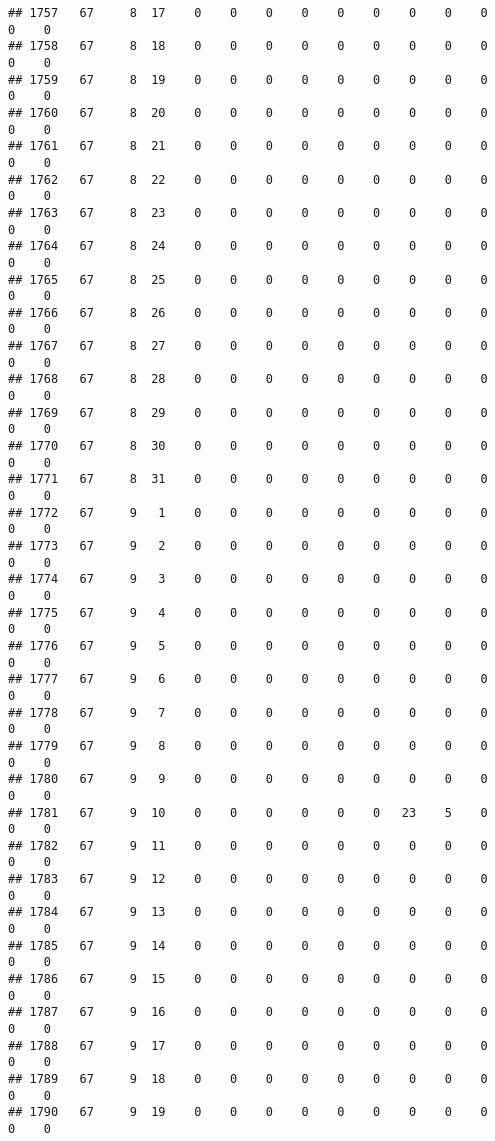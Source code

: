 \documentclass[]{article}
\begin{document}
\begin{verbatim}
## 1757   67     8  17    0    0    0    0    0    0    0    0    0    0    0
## 1758   67     8  18    0    0    0    0    0    0    0    0    0    0    0
## 1759   67     8  19    0    0    0    0    0    0    0    0    0    0    0
## 1760   67     8  20    0    0    0    0    0    0    0    0    0    0    0
## 1761   67     8  21    0    0    0    0    0    0    0    0    0    0    0
## 1762   67     8  22    0    0    0    0    0    0    0    0    0    0    0
## 1763   67     8  23    0    0    0    0    0    0    0    0    0    0    0
## 1764   67     8  24    0    0    0    0    0    0    0    0    0    0    0
## 1765   67     8  25    0    0    0    0    0    0    0    0    0    0    0
## 1766   67     8  26    0    0    0    0    0    0    0    0    0    0    0
## 1767   67     8  27    0    0    0    0    0    0    0    0    0    0    0
## 1768   67     8  28    0    0    0    0    0    0    0    0    0    0    0
## 1769   67     8  29    0    0    0    0    0    0    0    0    0    0    0
## 1770   67     8  30    0    0    0    0    0    0    0    0    0    0    0
## 1771   67     8  31    0    0    0    0    0    0    0    0    0    0    0
## 1772   67     9   1    0    0    0    0    0    0    0    0    0    0    0
## 1773   67     9   2    0    0    0    0    0    0    0    0    0    0    0
## 1774   67     9   3    0    0    0    0    0    0    0    0    0    0    0
## 1775   67     9   4    0    0    0    0    0    0    0    0    0    0    0
## 1776   67     9   5    0    0    0    0    0    0    0    0    0    0    0
## 1777   67     9   6    0    0    0    0    0    0    0    0    0    0    0
## 1778   67     9   7    0    0    0    0    0    0    0    0    0    0    0
## 1779   67     9   8    0    0    0    0    0    0    0    0    0    0    0
## 1780   67     9   9    0    0    0    0    0    0    0    0    0    0    0
## 1781   67     9  10    0    0    0    0    0    0   23    5    0    0    0
## 1782   67     9  11    0    0    0    0    0    0    0    0    0    0    0
## 1783   67     9  12    0    0    0    0    0    0    0    0    0    0    0
## 1784   67     9  13    0    0    0    0    0    0    0    0    0    0    0
## 1785   67     9  14    0    0    0    0    0    0    0    0    0    0    0
## 1786   67     9  15    0    0    0    0    0    0    0    0    0    0    0
## 1787   67     9  16    0    0    0    0    0    0    0    0    0    0    0
## 1788   67     9  17    0    0    0    0    0    0    0    0    0    0    0
## 1789   67     9  18    0    0    0    0    0    0    0    0    0    0    0
## 1790   67     9  19    0    0    0    0    0    0    0    0    0    0    0

\end{verbatim}
\end{document}
